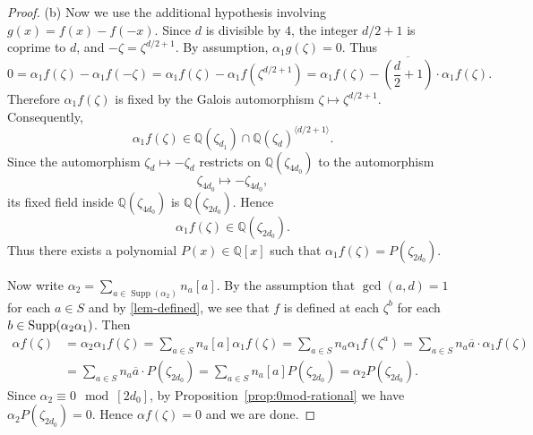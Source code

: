 \documentclass[12t,a4paper]{amsart}
\theoremstyle{definition}
\DeclareMathOperator{\supp}{{\rm Supp}}
\numberwithin{equation}{section}
\begin{document}
{\begin{proof}
 (b) Now we use the additional hypothesis involving \(     g(x)=f(x)-f(-x).
\)
Since \(d\) is divisible by \(4\), the integer \(d/2+1\) is coprime to \(d\), and
\(
    -\zeta=\zeta^{d/2+1}.
\) 
By assumption,
\(
    \alpha_1 g(\zeta)=0.
\)
Thus
\[
    0     =     \alpha_1 f(\zeta)-\alpha_1 f(-\zeta)     =     \alpha_1 f(\zeta)-\alpha_1 f(\zeta^{d/2+1}) = \alpha_1 f(\zeta) -\overline{(\frac{d}{2}+1)} \cdot \alpha_1 f(\zeta).
\]
Therefore \(\alpha_1 f(\zeta)\) is fixed by the Galois automorphism \(
    \zeta\longmapsto \zeta^{d/2+1}.\)
Consequently,
\[
    \alpha_1 f(\zeta)
    \in
    \mathbb Q(\zeta_{d_1})\cap
    \mathbb Q(\zeta_d)^{\langle d/2+1\rangle}.
\]
Since the automorphism \(\zeta_d\mapsto -\zeta_d\) restricts on
\(\mathbb Q(\zeta_{4d_0})\) to the automorphism
\[
    \zeta_{4d_0}\longmapsto -\zeta_{4d_0},
\]
its fixed field inside \(\mathbb Q(\zeta_{4d_0})\) is \(     \mathbb Q(\zeta_{2d_0}).\)
Hence
\[
    \alpha_1 f(\zeta)\in \mathbb Q(\zeta_{2d_0}).
\]
Thus there exists a polynomial \(P(x)\in \mathbb Q[x]\) such that
\(
    \alpha_1 f(\zeta)=P(\zeta_{2d_0}).
\)

Now write
\(
    \alpha_2=\sum\limits_{a\in \operatorname{Supp}(\alpha_2)} n_a[a].
\)
By the assumption that $\gcd(a,d)=1$ for each $a\in S$ and  by \cref{lem-defined}, we see that $f$ is defined at each $\zeta^{b}$ for each $b\in \supp(\alpha_2\alpha_1)$. Then 
\[\begin{aligned}
    \alpha f(\zeta) &= \alpha_2 \alpha_1f(\zeta)= \sum_{a \in S} n_a[a]\alpha_1f(\zeta) = \sum_{a \in S} n_a\alpha_1 f(\zeta^{a})=\sum_{a \in S} n_a \overline{a}\cdot \alpha_1 f(\zeta)\\
    &=\sum_{a \in S} n_a \overline{a} \cdot P(\zeta_{2d_0})
    = \sum_{a \in S} n_a [a]P(\zeta_{2d_0}) =\alpha_2 P(\zeta_{2d_0}).
 \end{aligned}\]
 Since $\alpha_2\equiv 0\mod {[2d_0]}$, by Proposition~\ref{prop:0mod-rational} we have $\alpha_2 P(\zeta_{2d_0})=0$. Hence $\alpha f(\zeta)=0$ and we are done.
\end{proof}


}
\end{document}
